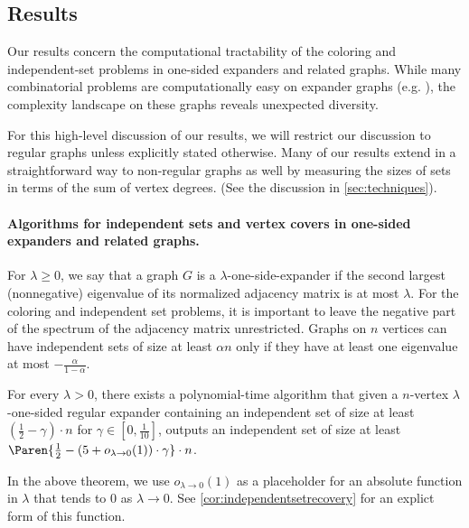 \subsection*{Results}

Our results concern the computational tractability of the coloring and independent-set problems in one-sided expanders and related graphs.
While many combinatorial problems are computationally easy on expander graphs (e.g. \cite{arora-khot-kolla-steurer-tulsiani-vishnoi}),
the complexity landscape on these graphs reveals unexpected diversity.

For this high-level discussion of our results, we will restrict our discussion to regular graphs unless explicitly stated otherwise.
Many of our results extend in a straightforward way to non-regular graphs as well by measuring the sizes of sets in terms of the sum of vertex degrees.
(See the discussion in \cref{sec:techniques}).

\paragraph{Algorithms for independent sets and vertex covers in one-sided expanders and related graphs.}

For \(\lambda\ge 0\), we say that a graph \(G\) is a \(\lambda\)-one-side-expander if the second largest (nonnegative) eigenvalue of its normalized adjacency matrix is at most \(\lambda\).
For the coloring and independent set problems, it is important to leave the negative part of the spectrum of the adjacency matrix unrestricted.
Graphs on \(n\) vertices can have independent sets of size at least \(\alpha n\) only if they have at least one eigenvalue at most \(-\tfrac{\alpha}{1-\alpha}\).

\begin{theorem}
  For every \(\lambda>0\), there exists a polynomial-time algorithm that given a \(n\)-vertex \(\lambda\)-one-sided regular expander containing an independent set of size at least \((\tfrac 1 2 - \gamma) \cdot n\) for \(\gamma\in [0,\tfrac 1 {10}]\),
  outputs an independent set of size at least \(\Paren{\tfrac 12-(5+o_{\lambda\to 0}(1))\cdot \gamma}\cdot n\).
\end{theorem}

In the above theorem, we use \(o_{\lambda\to 0}(1)\) as a placeholder for an absolute function in \(\lambda\) that tends to \(0\) as \(\lambda\to 0\).
See \cref{cor:independentsetrecovery} for an explict form of this function.

